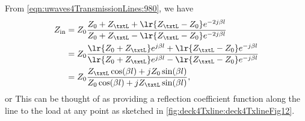 From \cref{eqn:uwaves4TransmissionLines:980}, we have
\begin{equation}\label{eqn:uwaves4TransmissionLinesCore:1440}
\begin{aligned}
Z_{\textrm{in}}
&= Z_0 \frac{Z_0 + Z_\txtL + \lr{Z_\txtL - Z_0} e^{-2 j \beta l}}{Z_0 + Z_\txtL - \lr{Z_\txtL - Z_0} e^{-2 j \beta l}}
\\ &= Z_0 \frac{\lr{Z_0 + Z_\txtL} e^{j\beta l} + \lr{Z_\txtL - Z_0} e^{- j \beta l}}{\lr{Z_0 + Z_\txtL} e^{j\beta l} - \lr{Z_\txtL - Z_0} e^{- j \beta l}}
\\ &= Z_0
\frac
{Z_\txtL \cos( \beta l ) + j Z_0 \sin(\beta l ) }
{Z_0 \cos( \beta l ) + j Z_\txtL \sin(\beta l ) },
\end{aligned}
\end{equation}
or
This can be thought of as providing a reflection coefficient function along the line to the load at any point as sketched in \cref{fig:deck4Txline:deck4TxlineFig12}.
